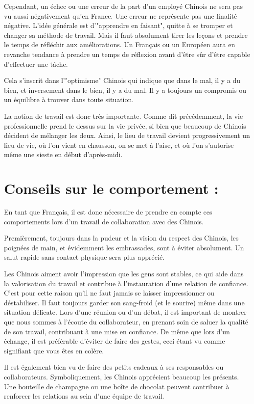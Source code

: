 \documentclass{article}
\begin{document}
Cependant, un échec ou une erreur de la part d'un employé Chinois ne sera pas vu aussi négativement qu'en France. Une erreur ne représente pas une finalité négative. L'idée générale est d'"apprendre en faisant", quitte à se tromper et changer sa méthode de travail. Mais il faut absolument tirer les leçons et prendre le temps de réfléchir aux améliorations. Un Français ou un Européen aura en revanche tendance à prendre un temps de réflexion avant d'être sûr d'être capable d'effectuer une tâche.

Cela s'inscrit dans l'"optimisme" Chinois qui indique que dans le mal, il y a du bien, et inversement dans le bien, il y a du mal. Il y a toujours un compromis ou un équilibre à trouver dans toute situation.

La notion de travail est donc très importante. Comme dit précédemment, la vie professionnelle prend le dessus sur la vie privée, si bien que beaucoup de Chinois décident de mélanger les deux. Ainsi, le lieu de travail devient progressivement un lieu de vie, où l'on vient en chausson, on se met à l'aise, et où l'on s'autorise même une sieste en début d'après-midi. \\


\section{Conseils sur le comportement :}
En tant que Français, il est donc nécessaire de prendre en compte ces comportements lors d'un travail de collaboration avec des Chinois.

Premièrement, toujours dans la pudeur et la vision du respect des Chinois, les poignées de main, et évidemment les embrassades, sont à éviter absolument. Un salut rapide sans contact physique sera plus apprécié.

Les Chinois aiment avoir l'impression que les gens sont stables, ce qui aide dans la valorisation du travail et contribue à l'instauration d'une relation de confiance. C'est pour cette raison qu'il ne faut jamais se laisser impressionner ou déstabiliser. Il faut toujours garder son sang-froid (et le sourire) même dans une situation délicate. Lors d'une réunion ou d'un débat, il est important de montrer que nous sommes à l'écoute du collaborateur, en prenant soin de saluer la qualité de son travail, contribuant à une mise en confiance. De même que lors d'un échange, il est préférable d'éviter de faire des gestes, ceci étant vu comme signifiant que vous êtes en colère.

Il est également bien vu de faire des petits cadeaux à ses responsables ou collaborateurs. Symboliquement, les Chinois apprécient beaucoup les présents. Une bouteille de champagne ou une boîte de chocolat peuvent contribuer à renforcer les relations au sein d'une équipe de travail.
\end{document}
